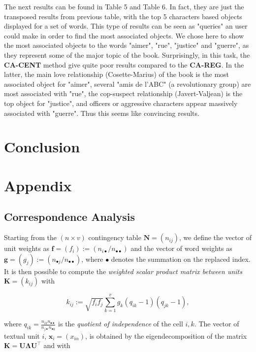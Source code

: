 \documentclass[
twocolumn,
]{ceurart}
\begin{document}
The next results can be found in Table 5 and Table 6. In fact, they are just the transposed results from previous table, with the top 5 characters based objects displayed for a set of words. This type of results can be seen as "queries" an user could make in order to find the most associated objects. We chose here to show the most associated objects to the words "aimer", "rue", "justice" and "guerre", as they represent some of the major topic of the book. Surprisingly, in this task, the \textbf{CA-CENT} method give quite poor results compared to the \textbf{CA-REG}. In the latter, the main love relationship (Cosette-Marius) of the book is the most associated object for "aimer", several "amis de l'ABC" (a revolutionary group) are most associated with "rue", the cop-suspect relationship (Javert-Valjean) is the top object for "justice", and officers or aggressive characters appear massively associated with "guerre". Thus this seems like convincing results.
	
\section{Conclusion}

\appendix

\section{Appendix}

\subsection{Correspondence Analysis}
\label{ca_details}

Starting from the $(n \times v)$ contingency table $\mathbf{N} = (n_{ij})$, we define the vector of unit weights as $\mathbf{f} = (f_i) := (n_{i\bullet}/n_{\bullet \bullet})$ and the vector of word weights as $\mathbf{g} = (g_j) := (n_{\bullet j}/n_{\bullet \bullet})$, where $\bullet$ denotes the summation on the replaced index. It is then possible to compute the \emph{weighted scalar product matrix between units} $\mathbf{K} = (k_{ij})$ with

\begin{equation}
k_{ij} := \sqrt{f_i f_j} \sum_{k=1}^{v} g_k(q_{ik} - 1)(q_{jk} - 1), 
\end{equation}

where $q_{ik} = \frac{n_{ik} n_{\bullet \bullet}}{n_{j \bullet} n_{\bullet k}}$ is the \emph{quotient of independence} of the cell $i, k$. The vector of textual unit $i$, $\mathbf{x}_i = (x_{i\alpha})$, is obtained by the eigendecomposition of the matrix $\mathbf{K} = \mathbf{U}\bm{\Lambda}\mathbf{U}^\top$ and with
\end{document}
